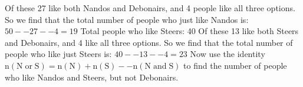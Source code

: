 {\begin{mdframed}[linewidth=4, leftmargin=40, rightmargin=40]
\begin{exercise}
\begin{enumerate}[noitemsep, label=\textbf{Step} \textbf{\arabic*}. ]
Of these 27 like both Nandos and Debonairs, and 4 people like all three options. So we find that the total number of people who just like Nandos is: $50--27--4=19$\newline
Total people who like Steers: 40\newline
Of these 13 like both Steers and Debonairs, and 4 like all three options. So we find that the total number of people who like just Steers is: $40--13--4=23$\newline
Now use the identity $\mathrm{n\left(N\; or\; S\right)}=\mathrm{n\left(N\right)}+\mathrm{n\left(S\right)}--\mathrm{n\left(N\; and\; S\right)}$ to find the number of people who like Nandos and Steers, but not Debonairs.
\label{m39377*id734}\nopagebreak\noindent{}
\end{enumerate}
\end{exercise}
\end{mdframed}}
